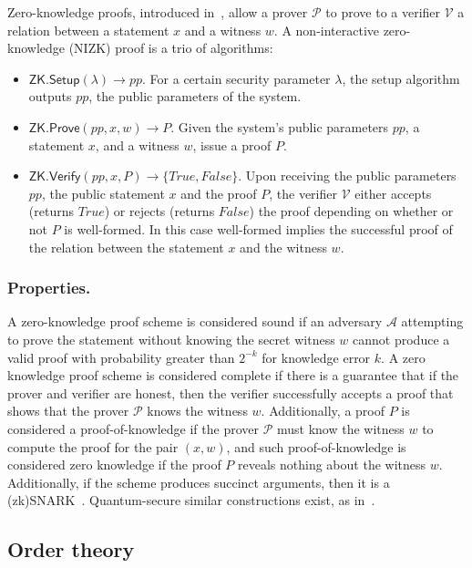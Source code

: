 \documentclass[runningheads]{llncs}
\begin{document}
Zero-knowledge proofs, introduced in~\cite{zkp}, allow a prover $\mathcal{P}$ to prove to a verifier $\mathcal{V}$ a relation between a statement $x$ and a witness $w$. A non-interactive zero-knowledge (NIZK) proof is a trio of algorithms:

\begin{itemize}
  \setlength\itemsep{0.35em}

    \item $\mathsf{ZK.Setup}(\lambda) \rightarrow pp$. For a certain security parameter $\lambda$, the setup algorithm outputs $pp$, the public parameters of the system. 
    \item $\mathsf{ZK.Prove}(pp, x, w) \rightarrow P$. Given the system's public parameters $pp$, a statement $x$, and a witness $w$, issue a proof $P$.
    \item $\mathsf{ZK.Verify}(pp, x, P) \rightarrow \{True,False\}$. Upon receiving the public parameters $pp$, the public statement $x$ and the proof $P$, the verifier $\mathcal{V}$ either accepts (returns \(True\)) or rejects (returns \(False\)) the proof depending on whether or not $P$ is well-formed. In this case well-formed implies the successful proof of the relation between the statement $x$ and the witness $w$. 
\end{itemize}

\subsubsection{Properties.} A zero-knowledge proof scheme is considered sound if an adversary $\mathcal{A}$ attempting to prove the statement without knowing the secret witness $w$ cannot produce a valid proof with probability greater than $2^{-k}$ for knowledge error $k$. A zero knowledge proof scheme is considered complete if there is a guarantee that if the prover and verifier are honest, then the verifier successfully accepts a proof that shows that the prover $\mathcal{P}$ knows the witness $w$. Additionally, a proof $P$ is considered a proof-of-knowledge if the prover $\mathcal{P}$ must know the witness $w$ to compute the proof for the pair $(x, w)$, and such proof-of-knowledge is considered zero knowledge if the proof $P$ reveals nothing about the witness $w$. Additionally, if the scheme produces succinct arguments, then it is a (zk)SNARK~\cite{supersonic,marlin,plonk,groth16,sonic}. Quantum-secure similar constructions exist, as in~\cite{zkstarks,pq_zk}.

\subsection{Order theory}
\end{document}
